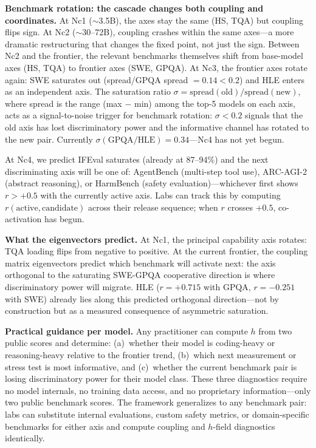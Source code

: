 \documentclass{article}
\begin{document}
\textbf{Benchmark rotation: the cascade changes both coupling and coordinates.}
At Nc1 (${\sim}$3.5B), the axes stay the same (HS, TQA) but coupling flips sign.
At Nc2 (${\sim}$30--72B), coupling crashes within the same axes---a more dramatic
restructuring that changes the fixed point, not just the sign.
Between Nc2 and the frontier, the relevant benchmarks themselves shift
from base-model axes (HS, TQA) to frontier axes (SWE, GPQA).
At Nc3, the frontier axes rotate again: SWE saturates out (spread/GPQA spread $= 0.14 < 0.2$)
and HLE enters as an independent axis.
The saturation ratio $\sigma = \text{spread}(\text{old}) / \text{spread}(\text{new})$,
where spread is the range (max $-$ min) among the top-5 models on each axis,
acts as a signal-to-noise trigger for benchmark rotation:
$\sigma < 0.2$ signals that the old axis has lost discriminatory power
and the informative channel has rotated to the new pair.
Currently $\sigma(\text{GPQA}/\text{HLE}) = 0.34$---Nc4 has not yet begun.

At Nc4, we predict IFEval saturates (already at 87--94\%)
and the next discriminating axis will be one of:
AgentBench (multi-step tool use), ARC-AGI-2 (abstract reasoning),
or HarmBench (safety evaluation)---whichever first shows $r > +0.5$
with the currently active axis.
Labs can track this by computing $r(\text{active}, \text{candidate})$
across their release sequence; when $r$ crosses $+0.5$, co-activation has begun.

\textbf{What the eigenvectors predict.}
At Nc1, the principal capability axis rotates: TQA loading flips from negative to positive.
At the current frontier, the coupling matrix eigenvectors predict
which benchmark will activate next:
the axis orthogonal to the saturating SWE-GPQA cooperative direction
is where discriminatory power will migrate.
HLE ($r = +0.715$ with GPQA, $r = -0.251$ with SWE) already lies
along this predicted orthogonal direction---not by construction
but as a measured consequence of asymmetric saturation.

\textbf{Practical guidance per model.}
Any practitioner can compute $h$ from two public scores
and determine: (a)~whether their model is coding-heavy or reasoning-heavy
relative to the frontier trend,
(b)~which next measurement or stress test is most informative,
and (c)~whether the current benchmark pair is losing discriminatory power
for their model class.
These three diagnostics require no model internals, no training data access,
and no proprietary information---only two public benchmark scores.
The framework generalizes to any benchmark pair: labs can substitute
internal evaluations, custom safety metrics, or domain-specific benchmarks
for either axis and compute coupling and $h$-field diagnostics identically.
\end{document}
